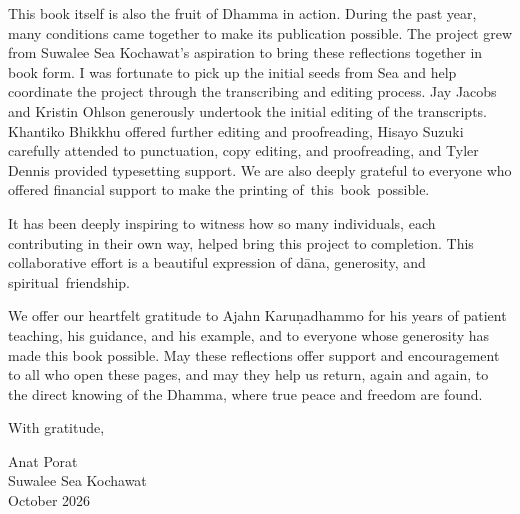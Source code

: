 \enlargethispage{-1\baselineskip}
This book itself is also the fruit of Dhamma in action. During the past year, many conditions came together to make its publication possible. The project grew from Suwalee Sea Kochawat's aspiration to bring these reflections together in book form. I was fortunate to pick up the initial seeds from Sea and help coordinate the project through the transcribing and editing process. Jay Jacobs and Kristin Ohlson generously undertook the initial editing of the transcripts. Khantiko Bhikkhu offered further editing and proofreading, Hisayo Suzuki carefully attended to punctuation, copy editing, and proofreading, and Tyler Dennis provided typesetting support. We are also deeply grateful to everyone who offered financial support to make the printing \mbox{of this book possible.}

It has been deeply inspiring to witness how so many individuals, each contributing in their own way, helped bring this project to completion. This collaborative effort is a beautiful expression of dāna, generosity, and \mbox{spiritual friendship.}

We offer our heartfelt gratitude to Ajahn Karuṇadhammo for his years of patient teaching, his guidance, and his example, and to everyone whose generosity has made this book possible. May these reflections offer support and encouragement to all who open these pages, and may they help us return, again and again, to the direct knowing of the Dhamma, where true peace and freedom are found.

{\raggedleft
With gratitude,

  Anat Porat\\
  Suwalee Sea Kochawat\\
  October 2026
\par}
